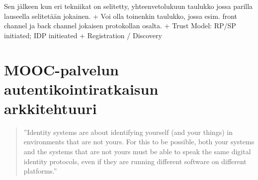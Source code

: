 \documentclass[finnish,gradu]{tktltiki}
\begin{document}
  Sen jälkeen kun eri tekniikat on selitetty, yhteenvetolukuun taulukko jossa parilla lauseella selitetään jokainen.
  + Voi olla toinenkin taulukko, jossa esim. front channel ja back channel jokaisen protokollan osalta.
  + Trust Model: RP/SP initiated; IDP initieated %
  + Registration / Discovery %











\section{MOOC-palvelun autentikointiratkaisun arkkitehtuuri} %
\label{sec:mooc_palvelun_autentikointiratkaisun_arkkitehtuuri}

  \begin{quote}
    ''Identity systems are about identifying yourself (and your things) in environments that are not yours.
    For this to be possible, both your systems and the systems that are not yours
    must be able to speak the same digital identity protocols,
    even if they are running different software on different platforms.''~\cite{cameron_id_arch_2006}
  \end{quote}
\end{document}
